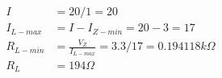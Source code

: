 \documentclass[11pt]{article}
\begin{document}
\begin{preview}
\begin{enumerate}[label=\alph*)]
          \begin{align*}
            I &= 20/1=20 \\
            I_{L-max} &= I - I_{Z-min} = 20-3=17 \\
            R_{L-min} &= \frac{V_Z}{I_{L-max}} = 3.3/17=0.194118k\Omega \\
            R_L &= 194\Omega
          \end{align*}

\end{enumerate}
\end{preview}
\end{document}
